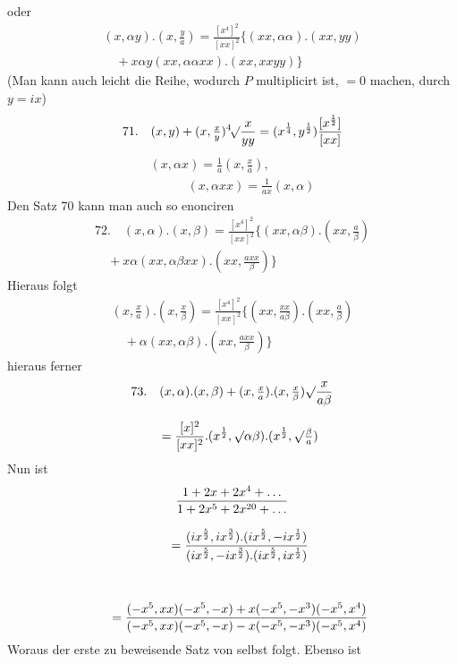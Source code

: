 oder
\[
\begin{gathered}(x,\alpha y).(x,\tfrac ya)
 =\frac{[x^4]^2}{[xx]^2}\{(xx,\alpha\alpha).(xx,yy)
 \\[8pt]\quad{}+x\alpha y(xx,\alpha\alpha xx).(xx,xxyy)\}\end{gathered}
\]
(Man kann auch leicht die Reihe, wodurch $P$ multiplicirt ist, $=0$ machen,
durch $y=ix$)
\[
71.\quad{}
(x,y)+(x,\tfrac xy)\mathord{{}^{4}\!\surd}{\frac x{yy}}
 =(x^{\frac14},y^{\frac12})\frac{[x^{\frac12}]}{[xx]}
\]
\[
\begin{gathered}(x,\alpha x)=\frac1a(x,\tfrac xa),
\\[8pt]\quad{}\qquad
(x,\alpha xx)=\frac1{ax}(x,\alpha)\end{gathered}
\]
Den Satz 70 kann man auch so enonciren
\[
\begin{gathered}72.\quad{}
(x,\alpha).(x,\beta)=\frac{[x^4]^2}{[xx]^2}
 \{(xx,\alpha\beta).(xx,\tfrac a\beta)
 \\[8pt]\quad{}+x\alpha(xx,\alpha\beta xx).(xx,\tfrac{axx}\beta)\}\end{gathered}
\]
Hieraus folgt
\[
\begin{gathered}(x,\tfrac xa).(x,\tfrac x\beta)=\frac{[x^4]^2}{[xx]^2}
 \{(xx,\tfrac{xx}{a\beta}).(xx,\tfrac a\beta)
 \\[8pt]\quad{}+\alpha(xx,\alpha\beta).(xx,\tfrac{axx}\beta)\}\end{gathered}
\]
hieraus ferner
\[
\begin{gathered}73.\quad{}
(x,\alpha).(x,\beta)+(x,\tfrac xa).(x,\tfrac x\beta)\mathord{\surd}{\frac x{a\beta}}
 \\[8pt]\quad{}=\frac{[x]^2}{[xx]^2}.(x^{\frac12},\mathord{\surd}{\alpha\beta}).(x^{\frac12},\mathord{\surd}{\tfrac\beta a})\end{gathered}
\]
Nun ist
\[
\begin{gathered}
\frac{1+2x+2x^4+\mathinner{.\,.\,.}}{1+2x^5+2x^{20}+\mathinner{.\,.\,.}}
\\[8pt]\quad{}=\frac{(ix^{\frac52},ix^{\frac32}).(ix^{\frac52},-ix^{\frac12})}
 {(ix^{\frac52},-ix^{\frac32}).(ix^{\frac52},ix^{\frac12})}\\[1ex]
\\[8pt]\quad{}=\frac{(-x^5,xx)(-x^5,-x)+x(-x^5,-x^3)(-x^5,x^4)}
 {(-x^5,xx)(-x^5,-x)-x(-x^5,-x^3)(-x^5,x^4)}
\end{gathered}
\]
Woraus der erste zu beweisende Satz von selbst folgt. Ebenso ist
